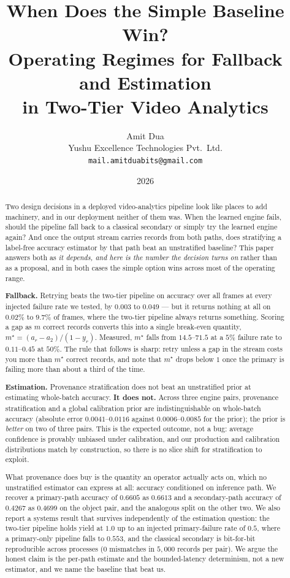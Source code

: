 \documentclass[11pt,a4paper]{article}
\title{When Does the Simple Baseline Win?\\Operating Regimes for Fallback and Estimation\\in Two-Tier Video Analytics}
\author{Amit Dua\\Yushu Excellence Technologies Pvt.\ Ltd.\\\texttt{mail.amitduabits@gmail.com}}
\date{2026}
\begin{document}
\maketitle

\begin{abstract}
Two design decisions in a deployed video-analytics pipeline look like places to
add machinery, and in our deployment neither of them was. When the learned engine
fails, should the pipeline fall back to a classical secondary or simply try the
learned engine again? And once the output stream carries records from both paths,
does stratifying a label-free accuracy estimator by that path beat an unstratified
baseline? This paper answers both as \emph{it depends, and here is the number the
decision turns on} rather than as a proposal, and in both cases the simple option
wins across most of the operating range.

\textbf{Fallback.} Retrying beats the two-tier pipeline on accuracy over all
frames at every injected failure rate we tested, by $0.003$ to $0.049$ --- but it
returns nothing at all on $0.02\%$ to $9.7\%$ of frames, where the two-tier
pipeline always returns something. Scoring a gap as $m$ correct records
converts this into a single break-even quantity, $m^\star = (a_r - a_2)/(1 - y_r)$.
Measured, $m^\star$ falls from $14.5$--$71.5$ at a $5\%$ failure rate to
$0.11$--$0.45$ at $50\%$. The rule that follows is sharp: retry unless a gap in
the stream costs you more than $m^\star$ correct records, and note that $m^\star$
drops below $1$ once the primary is failing more than about a third of the time.

\textbf{Estimation.} Provenance stratification does not beat an unstratified
prior at estimating whole-batch accuracy. \textbf{It does not.} Across three engine pairs, provenance stratification and a global
calibration prior are indistinguishable on whole-batch accuracy (absolute error
$0.0041$--$0.0116$ against $0.0006$--$0.0085$ for the prior); the prior is
\emph{better} on two of three pairs. This is the expected outcome, not a bug:
average confidence is provably unbiased under calibration, and our production and
calibration distributions match by construction, so there is no slice shift for
stratification to exploit.

What provenance does buy is the quantity an operator actually acts on, which no
unstratified estimator can express at all: accuracy conditioned on inference path.
We recover a primary-path accuracy of $0.6605$ as $0.6613$ and a secondary-path
accuracy of $0.4267$ as $0.4699$ on the object pair, and the analogous split on
the other two. We also report a systems result that survives independently of the
estimation question: the two-tier pipeline holds yield at $1.0$ up to an injected
primary-failure rate of $0.5$, where a primary-only pipeline falls to $0.553$, and
the classical secondary is bit-for-bit reproducible across processes ($0$
mismatches in $5{,}000$ records per pair). We argue the honest claim is the
per-path estimate and the bounded-latency determinism, not a new estimator, and we
name the baseline that beat us.


\end{abstract}
\end{document}
